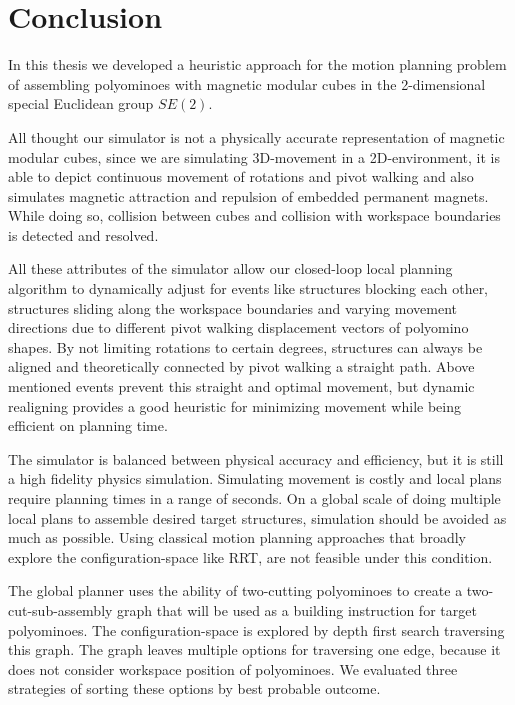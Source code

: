 \chapter{Conclusion}
\label{chap:conclusion}

In this thesis we developed a heuristic approach for the motion planning problem of assembling polyominoes with magnetic modular cubes \cite{Bhattacharjee2022} in the 2-dimensional special Euclidean group $\textit{SE}(2)$.

All thought our simulator is not a physically accurate representation of magnetic modular cubes, since we are simulating 3D-movement in a 2D-environment, it is able to depict continuous movement of rotations and pivot walking and also simulates magnetic attraction and repulsion of embedded permanent magnets.
While doing so, collision between cubes and collision with workspace boundaries is detected and resolved.

All these attributes of the simulator allow our closed-loop local planning algorithm to dynamically adjust for events like structures blocking each other, structures sliding along the workspace boundaries and varying movement directions due to different pivot walking displacement vectors of polyomino shapes.
By not limiting rotations to certain degrees, structures can always be aligned and theoretically connected by pivot walking a straight path.
Above mentioned events prevent this straight and optimal movement, but dynamic realigning provides a good heuristic for minimizing movement while being efficient on planning time.

The simulator is balanced between physical accuracy and efficiency, but it is still a high fidelity physics simulation.
Simulating movement is costly and local plans require planning times in a range of seconds.
On a global scale of doing multiple local plans to assemble desired target structures, simulation should be avoided as much as possible.
Using classical motion planning approaches that broadly explore the configuration-space like RRT, are not feasible under this condition.

The global planner uses the ability of two-cutting polyominoes to create a two-cut-sub-assembly graph that will be used as a building instruction for target polyominoes.
The configuration-space is explored by depth first search traversing this graph.
The graph leaves multiple options for traversing one edge, because it does not consider workspace position of polyominoes. 
We evaluated three strategies of sorting these options by best probable outcome.




